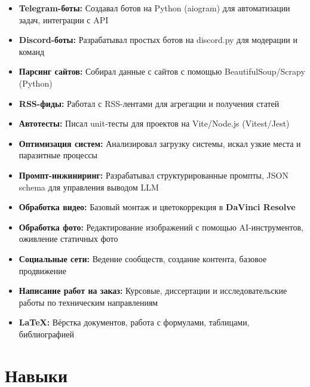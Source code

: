 \documentclass[10pt,a4paper]{article}
\begin{document}
\begin{itemize}
    \item \textbf{Telegram-боты:} Создавал ботов на Python (aiogram) для автоматизации задач, интеграции с API
    \item \textbf{Discord-боты:} Разрабатывал простых ботов на discord.py для модерации и команд
    \item \textbf{Парсинг сайтов:} Собирал данные с сайтов с помощью BeautifulSoup/Scrapy (Python)
    \item \textbf{RSS-фиды:} Работал с RSS-лентами для агрегации и получения статей
    \item \textbf{Автотесты:} Писал unit-тесты для проектов на Vite/Node.js (Vitest/Jest)
    \item \textbf{Оптимизация систем:} Анализировал загрузку системы, искал узкие места и паразитные процессы
    \item \textbf{Промпт-инжиниринг:} Разрабатывал структурированные промпты, JSON schema для управления выводом LLM
    \item \textbf{Обработка видео:} Базовый монтаж и цветокоррекция в \textbf{DaVinci Resolve}
    \item \textbf{Обработка фото:} Редактирование изображений с помощью AI-инструментов, оживление статичных фото
    \item \textbf{Социальные сети:} Ведение сообществ, создание контента, базовое продвижение
    \item \textbf{Написание работ на заказ:} Курсовые, диссертации и исследовательские работы по техническим направлениям
    \item \textbf{LaTeX:} Вёрстка документов, работа с формулами, таблицами, библиографией
\end{itemize}

\makeEducation

\section{Навыки}
\end{document}

